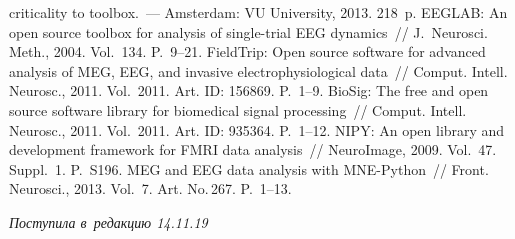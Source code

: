\begin{multicols}{2}
{{\begin{thebibliography}{99}
criticality to toolbox.~--- Amsterdam: VU University, 2013. 218~p.
   EEGLAB: An open source toolbox for analysis of 
single-trial EEG dynamics~// J.~Neurosci. Meth., 2004. Vol.~134. P.~9--21.
   FieldTrip: Open 
source software for advanced analysis of MEG, EEG, and invasive 
electrophysiological data~// Comput. Intell. Neurosc., 2011. 
Vol.~2011. Art. ID: 156869. P.~1--9.
   BioSig: The free 
and open source software library for biomedical signal processing~// 
Comput. Intell. Neurosc., 2011. Vol.~2011. Art. ID: 935364. 
P.~1--12.
   NIPY: An open library and 
development framework for FMRI data analysis~// NeuroImage, 2009. Vol.~47. 
Suppl.~1. P.~S196.
    MEG and EEG data 
analysis with MNE-Python~// Front. Neurosci., 2013. Vol.~7. Art. No.\,267.  
P.~1--13.
 \end{thebibliography}

 }
 }

\end{multicols}

\vspace*{-3pt}

\hfill{\small\textit{Поступила в~редакцию 14.11.19}}



\newpage

\vspace*{-28pt}





\def\tit{NEUROPHYSIOLOGY AS~A~SUBJECT DOMAIN\\ FOR~DATA 
INTENSIVE PROBLEM SOLVING}


\def\titkol{Neurophysiology as~a~subject domain for~data 
intensive problem solving}

\def\aut{D.\,O.~Briukhov, S.\,A.~Stupnikov, D.\,Yu.~Kovalev, and~I.\,A.~Shanin}

\def\autkol{D.\,O.~Briukhov, S.\,A.~Stupnikov, D.\,Yu.~Kovalev, and~I.\,A.~Shanin}

